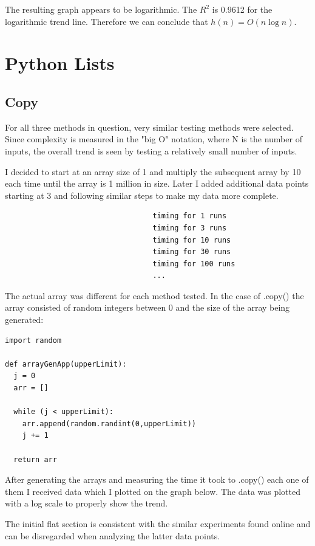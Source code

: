\documentclass[12pt]{article}
\begin{document}
\noindent The resulting graph appears to be logarithmic. The $R^2$ is 0.9612 for the logarithmic trend line. Therefore we can conclude that $h(n) = O(n\log{n})$.

\section{Python Lists}

\subsection{Copy}
For all three methods in question, very similar testing methods were selected. Since complexity is measured in the "big O" notation, where N is the number of inputs, the overall trend is seen by testing a relatively small number of inputs. 

I decided to start at an array size of 1 and multiply the subsequent array by 10 each time until the array is 1 million in size. Later I  added additional data points starting at 3 and following similar steps to make my data more complete. 

\footnotesize
\begin{verbatim}
                                  timing for 1 runs
                                  timing for 3 runs
                                  timing for 10 runs
                                  timing for 30 runs
                                  timing for 100 runs
                                  ...
\end{verbatim}
\normalsize
  
The actual array was different for each method tested. In the case of .copy() the array consisted of random integers between 0 and the size of the array being generated:

\footnotesize
\begin{verbatim}
import random

def arrayGenApp(upperLimit):
  j = 0
  arr = []

  while (j < upperLimit):
    arr.append(random.randint(0,upperLimit))
    j += 1

  return arr
\end{verbatim}
\normalsize

After generating the arrays and measuring the time it took to .copy() each one of them I received data which I plotted on the graph below. The data was plotted with a log scale to properly show the trend.

The initial flat section is consistent with the similar experiments found online and can be disregarded when analyzing the latter data points.
\end{document}
